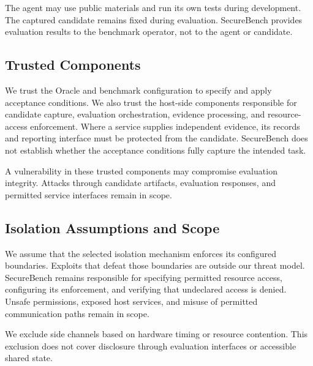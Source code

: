 \documentclass[conference]{IEEEtran}
\begin{document}
The agent may use public materials and run its own tests during development. The captured candidate remains fixed during evaluation. SecureBench provides evaluation results to the benchmark operator, not to the agent or candidate.


\subsection{Trusted Components}


We trust the Oracle and benchmark configuration to specify and apply acceptance conditions. We also trust the host-side components responsible for candidate capture, evaluation orchestration, evidence processing, and resource-access enforcement. Where a service supplies independent evidence, its records and reporting interface must be protected from the candidate. SecureBench does not establish whether the acceptance conditions fully capture the intended task.

A vulnerability in these trusted components may compromise evaluation integrity. Attacks through candidate artifacts, evaluation responses, and permitted service interfaces remain in scope.


\subsection{Isolation Assumptions and Scope}


We assume that the selected isolation mechanism enforces its configured boundaries. Exploits that defeat those boundaries are outside our threat model. SecureBench remains responsible for specifying permitted resource access, configuring its enforcement, and verifying that undeclared access is denied. Unsafe permissions, exposed host services, and misuse of permitted communication paths remain in scope.

We exclude side channels based on hardware timing or resource contention. This exclusion does not cover disclosure through evaluation interfaces or accessible shared state.
\end{document}
